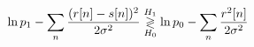 \documentclass[preview]{standalone}
\begin{document}
\begin{align*}
\special{dvisvgm:raw <g id='unique000'>}\ln p_1-\sum_n\frac{(r[n]-s[n])^2}{2\sigma^2}\underset{H_0}{\overset{H_1}{\gtrless}}\ln p_0 - \sum_n\frac{r^2[n]}{2\sigma^2}\special{dvisvgm:raw </g>}
\end{align*}
\end{document}
